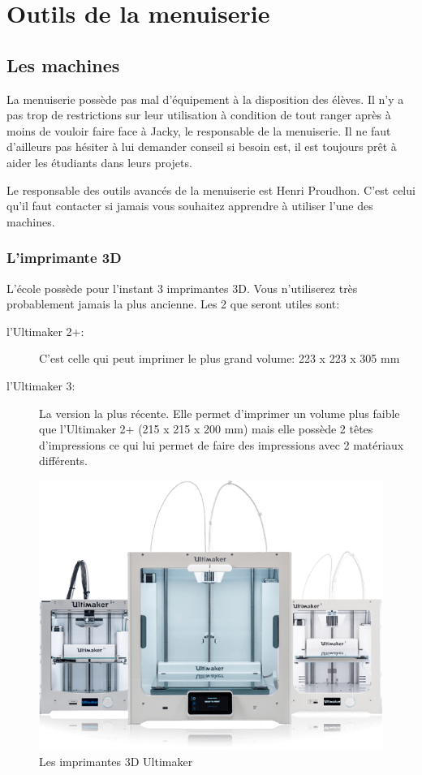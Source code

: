 \documentclass[a4paper, 11pt]{report}
\begin{document}
\part{Outils de la menuiserie}

\chapter{Les machines}
La menuiserie possède pas mal d'équipement à la disposition des élèves. Il n'y a pas trop de restrictions sur leur utilisation à condition de tout ranger après à moins de vouloir faire face à Jacky, le responsable de la menuiserie. Il ne faut d'ailleurs pas hésiter à lui demander conseil si besoin est, il est toujours prêt à aider les étudiants dans leurs projets.

Le responsable des outils avancés de la menuiserie est Henri Proudhon. C'est celui qu'il faut contacter si jamais vous souhaitez apprendre à utiliser l'une des machines.

\section{L'imprimante 3D}
L'école possède pour l'instant 3 imprimantes 3D. Vous n'utiliserez très probablement jamais la plus ancienne. Les 2 que seront utiles sont:
\begin{description}
\item[l'Ultimaker 2+:]C'est celle qui peut imprimer le plus grand volume: 223 x 223 x 305 mm
\item[l'Ultimaker 3:]La version la plus récente. Elle permet d'imprimer un volume plus faible que l'Ultimaker 2+ (215 x 215 x 200 mm) mais elle possède 2 têtes d'impressions ce qui lui permet de faire des impressions avec 2 matériaux différents.
\end{description}

\begin{figure}[h!]
	\begin{center}
		\includegraphics[scale=0.6]{images/ultimaker.png}
		\caption{Les imprimantes 3D Ultimaker}
	\end{center}
\end{figure}
\end{document}
